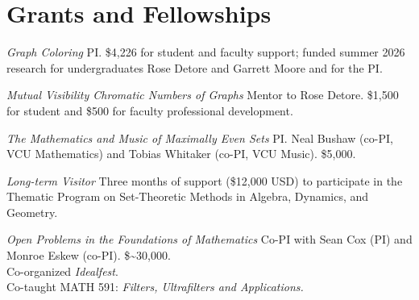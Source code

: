 \documentclass[11pt,a4paper]{moderncv}
\begin{document}









\section{Grants and Fellowships}

{\emph{Graph Coloring}}{}{}{
PI. \$4,226 for student and faculty support; funded summer 2026 research for undergraduates Rose Detore and Garrett Moore and for the PI.
}

{\emph{Mutual Visibility Chromatic Numbers of Graphs}}{}{}{
Mentor to Rose Detore. \$1,500 for student and \$500 for faculty professional development.
}

{\emph{The Mathematics and Music of Maximally Even Sets}}{}{}{
PI. Neal Bushaw (co-PI, VCU Mathematics) and Tobias Whitaker (co-PI, VCU Music). \$5,000.
}

{\emph{Long-term Visitor}}{}{}{
Three months of support (\$12,000 USD) to participate in the Thematic Program on Set-Theoretic Methods in Algebra, Dynamics, and Geometry.
}

{\emph{Open Problems in the Foundations of Mathematics}}{}{}{
Co-PI with Sean Cox (PI) and Monroe Eskew (co-PI). \$\textasciitilde30,000.\\[0.3em]
\textbullet\; Co-organized \emph{Idealfest}.\\
\textbullet\; Co-taught MATH 591: \emph{Filters, Ultrafilters and Applications.}
}

\end{document}
